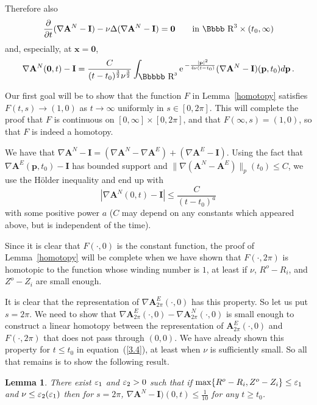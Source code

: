 \documentclass[12pt,twoside]{article}
\newcommand{\bA}{\mathbf{A}}
\newtheorem{lema}{Lemma}[section]
\newcommand {\ee}{{\rm e}\,}
\newcommand {\rtt}{\mbox{\Bbbbb R}}
\newcommand {\rdd}{\mbox{\Bbbb R}}
\newcommand {\bnul}{{\mathbf {0}}}
\newcommand {\bI}{{\mathbf{I}}}
\newcommand {\bx}{{\mathbf{x}}}
\newcommand {\bp}{{\mathbf{p}}}
\newcommand {\pder}[2]{\frac {\partial #1}{\partial #2}}
\begin{document}
Therefore also
$$
\displaystyle \pder{}{t} (\nabla \bA^N - \bI) - \nu \Delta (\nabla \bA^N-\bI) 
= \bnul \qquad {\rm in \ }
\rdd^3 \times (t_0,\infty) 
$$
and, especially, at $\bx=\bnul$,
\begin{equation} \label{4.1}
\nabla \bA^N(\bnul, t) - \bI = \frac {C}{(t-t_0)^{\frac 32} \nu^{\frac 32}} 
\int_{\rtt^3} \ee^{-\frac{|\bp|^2}{4\nu (t-t_0)}} (\nabla \bA^N-\bI)(\bp,t_0) 
d\bp\, .
\end{equation}

Our first goal will be to show that the function $F$ in Lemma~\ref{homotopy}
satisfies $F(t,s) \to (1,0)$ as $t \to \infty$ uniformly in $s \in [0,2\pi]$.
This will complete the proof that $F$ is continuous on 
$[0,\infty]\times[0,2\pi]$, and that $F(\infty,s) = (1,0)$, so that
$F$ is indeed a homotopy.

We have that $\nabla\bA^N - \bI = (\nabla\bA^N- \nabla\bA^E) +  (\nabla\bA^E
-\bI)$.
Using the fact that $\nabla \bA^E(\bp, t_0) -\bI$ has bounded support and 
$\|\nabla (\bA^N -\bA^E)\|_p(t_0) \leq C$,
we use the H\"older inequality and end up with
$$
|\nabla \bA^N(0, t) - \bI| \leq \frac{C}{(t-t_0)^a}
$$
with some positive power $a$ ($C$ may depend on any constants which
appeared above, but is independent of the time).

Since it is clear that $F(\cdot,0)$ is the constant function,
the proof of Lemma~\ref{homotopy} will be complete when we have
shown that 
$F(\cdot,2\pi)$ is homotopic to the function whose winding number is $1$,
at least if $\nu$, $R^o-R_i$, and $Z^o-Z_i$ are small enough.

It is clear that the representation of 
$\nabla\bA^E_{2\pi}(\cdot,0)$ has this property.  
So let us put $s=2\pi$.  
We need to
show that $\nabla\bA^E_{2\pi}(\cdot,0) - \nabla\bA^N_{2\pi}(\cdot,0)$ is 
small enough
to construct a linear homotopy between the representation of
$\bA^E_{2\pi}(\cdot,0)$ and 
$F(\cdot,2\pi)$ that does not pass through $(0,0)$.  We have already shown
this property for $t \le t_0$ in equation~(\ref{3.4}), at least when $\nu$
is sufficiently small.  So all that remains is to show the following result.

\begin{lema} \label{l 4.1}
There exist $\varepsilon_1$ and $\varepsilon_2 >0$ such that if $\max \{R^o-R_i, 
Z^o-Z_i\} \leq \varepsilon_1$ and $\nu \leq \varepsilon_2(\varepsilon_1)$ then for $s=2\pi$,
$ \nabla \bA^N - \bI)(0,t) \leq \frac{1}{10}$ for any 
$t\geq t_0$.
\end{lema}
\end{document}
